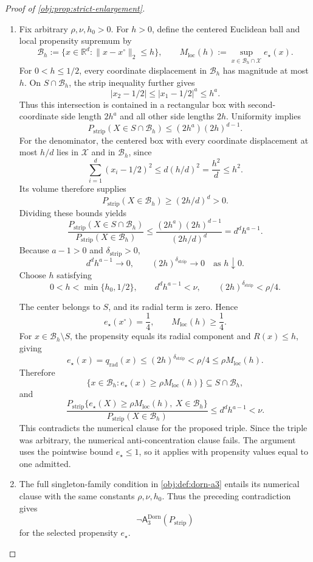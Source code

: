 \begin{proof}[Proof of \cref{obj:prop:strict-enlargement}]
\begin{enumerate}
\item Fix arbitrary \(\rho,\nu,h_0>0\). For \(h>0\), define the centered Euclidean ball and local propensity supremum by
\[
\mathcal B_h:=\{x\in\mathbb R^d:\|x-x^\circ\|_2\le h\},
\qquad
M_{\mathrm{loc}}(h)
:=\sup_{x\in\mathcal B_h\cap\mathcal X}e_\star(x).
\]
For \(0<h\le1/2\), every coordinate displacement in \(\mathcal B_h\) has magnitude at most \(h\). On \(S\cap\mathcal B_h\), the strip inequality further gives
\[
|x_2-1/2|\le |x_1-1/2|^a\le h^a.
\]
Thus this intersection is contained in a rectangular box with second-coordinate side length \(2h^a\) and all other side lengths \(2h\). Uniformity implies
\[
P_{\mathrm{strip}}(X\in S\cap\mathcal B_h)
\le(2h^a)(2h)^{d-1}.
\]
For the denominator, the centered box with every coordinate displacement at most \(h/d\) lies in \(\mathcal X\) and in \(\mathcal B_h\), since
\[
\sum_{i=1}^d(x_i-1/2)^2
\le d(h/d)^2
=\frac{h^2}{d}\le h^2.
\]
Its volume therefore supplies
\[
P_{\mathrm{strip}}(X\in\mathcal B_h)
\ge(2h/d)^d>0.
\]
Dividing these bounds yields
\[
\frac{P_{\mathrm{strip}}(X\in S\cap\mathcal B_h)}
{P_{\mathrm{strip}}(X\in\mathcal B_h)}
\le
\frac{(2h^a)(2h)^{d-1}}{(2h/d)^d}
=d^d h^{a-1}.
\]
Because \(a-1>0\) and \(\delta_{\mathrm{strip}}>0\),
\[
d^d h^{a-1}\longrightarrow0,
\qquad
(2h)^{\delta_{\mathrm{strip}}}\longrightarrow0
\quad\text{as }h\downarrow0.
\]
Choose \(h\) satisfying
\[
0<h<\min\{h_0,1/2\},
\qquad
d^d h^{a-1}<\nu,
\qquad
(2h)^{\delta_{\mathrm{strip}}}<\rho/4.
\]

The center belongs to \(S\), and its radial term is zero. Hence
\[
e_\star(x^\circ)=\frac14,
\qquad
M_{\mathrm{loc}}(h)\ge\frac14.
\]
For \(x\in\mathcal B_h\setminus S\), the propensity equals its radial component and \(R(x)\le h\), giving
\[
e_\star(x)=q_{\mathrm{rad}}(x)
\le(2h)^{\delta_{\mathrm{strip}}}
<\rho/4
\le\rho M_{\mathrm{loc}}(h).
\]
Therefore
\[
\{x\in\mathcal B_h:e_\star(x)\ge\rho M_{\mathrm{loc}}(h)\}
\subseteq S\cap\mathcal B_h,
\]
and
\[
\frac{
P_{\mathrm{strip}}\{e_\star(X)\ge\rho M_{\mathrm{loc}}(h),
\ X\in\mathcal B_h\}
}{
P_{\mathrm{strip}}(X\in\mathcal B_h)
}
\le d^d h^{a-1}<\nu.
\]
This contradicts the numerical clause for the proposed triple. Since the triple was arbitrary, the numerical anti-concentration clause fails. The argument uses the pointwise bound \(e_\star\le1\), so it applies with propensity values equal to one admitted.

\item The full singleton-family condition in \cref{obj:def:dorn-a3} entails its numerical clause with the same constants \(\rho,\nu,h_0\). Thus the preceding contradiction gives
\[
\neg\mathsf A_3^{\mathrm{Dorn}}(P_{\mathrm{strip}})
\]
for the selected propensity \(e_\star\).


\end{enumerate}
\end{proof}
